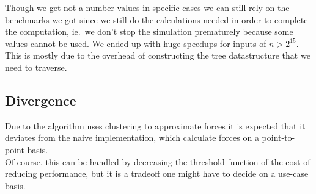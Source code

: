 Though we get not-a-number values in specific cases we can still rely on the
benchmarks we got since we still do the calculations needed in order to complete
the computation, ie.\ we don't stop the simulation prematurely because some
values cannot be used. We ended up with huge speedups for inputs of $n>2^{15}$.
This is mostly due to the overhead of constructing the tree datastructure that
we need to traverse.

\subsection{Divergence}
Due to the algorithm uses clustering to approximate forces it is expected that
it deviates from the naive implementation, which calculate forces on a
point-to-point basis.\\
Of course, this can be handled by decreasing the threshold function of the cost
of reducing performance, but it is a tradeoff one might have to decide on a
use-case basis.

\begin{Figure}
  \centering
  \label{fig:eatshit}
\end{Figure}

